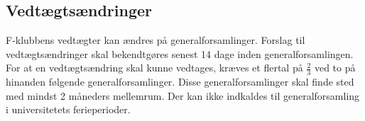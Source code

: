\documentclass[a4paper,12pt,danish]{article}
\begin{document}
\begin{list}
\section{Vedtægtsændringer}
  
\item F-klubbens vedtægter kan ændres på
  generalforsamlinger. Forslag til vedtægtsændringer skal
  bekendtgøres senest 14 dage inden generalforsamlingen. For at en
  vedtægtsændring skal kunne vedtages, kræves et flertal
  på $\frac{2}{3}$ ved to på hinanden følgende
  generalforsamlinger. Disse generalforsamlinger skal finde sted med
  mindst 2 måneders mellemrum.
  Der kan ikke indkaldes til generalforsamling i universitetets ferieperioder.

\end{list}
\end{document}
